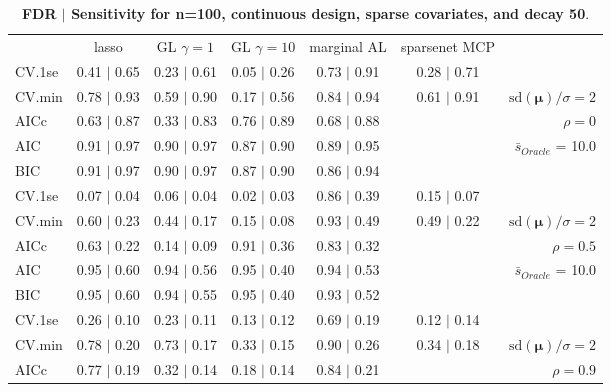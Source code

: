 \begin{table}\vspace{-.5cm}
\caption[l]{ {\it }
{ \bf FDR $\boldsymbol{\mid}$ Sensitivity for n=100, continuous design, sparse covariates, and  decay  50}.}
\vspace{-.5cm}
\footnotesize{}
\begin{center}
\begin{tabular}{l*{5}{c}|r}
 & lasso & GL $\gamma=1$ & GL $\gamma=10$ & marginal AL & sparsenet MCP  & \\
 \cline{1-7}
CV.1se & 0.41 $\mid$ 0.65 & 0.23 $\mid$ 0.61 & 0.05 $\mid$ 0.26 & 0.73 $\mid$ 0.91 & 0.28 $\mid$ 0.71 & \\
CV.min & 0.78 $\mid$ 0.93 & 0.59 $\mid$ 0.90 & 0.17 $\mid$ 0.56 & 0.84 $\mid$ 0.94 & 0.61 $\mid$ 0.91 &  $\mathrm{sd}(\mathbf{\mu})/\sigma=2$ \\
AICc & 0.63 $\mid$ 0.87 & 0.33 $\mid$ 0.83 & 0.76 $\mid$ 0.89 & 0.68 $\mid$ 0.88 & & $\rho=0$ \\
AIC & 0.91 $\mid$ 0.97 & 0.90 $\mid$ 0.97 & 0.87 $\mid$ 0.90 & 0.89 $\mid$ 0.95 & &  \multirow{2}{*}{$\bar{s}_{Oracle}$ = 10.0} \\
BIC & 0.91 $\mid$ 0.97 & 0.90 $\mid$ 0.97 & 0.87 $\mid$ 0.90 & 0.86 $\mid$ 0.94 & &  \\
 \hline 
CV.1se & 0.07 $\mid$ 0.04 & 0.06 $\mid$ 0.04 & 0.02 $\mid$ 0.03 & 0.86 $\mid$ 0.39 & 0.15 $\mid$ 0.07 & \\
CV.min & 0.60 $\mid$ 0.23 & 0.44 $\mid$ 0.17 & 0.15 $\mid$ 0.08 & 0.93 $\mid$ 0.49 & 0.49 $\mid$ 0.22 &  $\mathrm{sd}(\mathbf{\mu})/\sigma=2$ \\
AICc & 0.63 $\mid$ 0.22 & 0.14 $\mid$ 0.09 & 0.91 $\mid$ 0.36 & 0.83 $\mid$ 0.32 & & $\rho=0.5$ \\
AIC & 0.95 $\mid$ 0.60 & 0.94 $\mid$ 0.56 & 0.95 $\mid$ 0.40 & 0.94 $\mid$ 0.53 & &  \multirow{2}{*}{$\bar{s}_{Oracle}$ = 10.0} \\
BIC & 0.95 $\mid$ 0.60 & 0.94 $\mid$ 0.55 & 0.95 $\mid$ 0.40 & 0.93 $\mid$ 0.52 & &  \\
 \hline 
CV.1se & 0.26 $\mid$ 0.10 & 0.23 $\mid$ 0.11 & 0.13 $\mid$ 0.12 & 0.69 $\mid$ 0.19 & 0.12 $\mid$ 0.14 & \\
CV.min & 0.78 $\mid$ 0.20 & 0.73 $\mid$ 0.17 & 0.33 $\mid$ 0.15 & 0.90 $\mid$ 0.26 & 0.34 $\mid$ 0.18 &  $\mathrm{sd}(\mathbf{\mu})/\sigma=2$ \\
AICc & 0.77 $\mid$ 0.19 & 0.32 $\mid$ 0.14 & 0.18 $\mid$ 0.14 & 0.84 $\mid$ 0.21 & & $\rho=0.9$ \\

\end{tabular}
\end{center}
\end{table}
